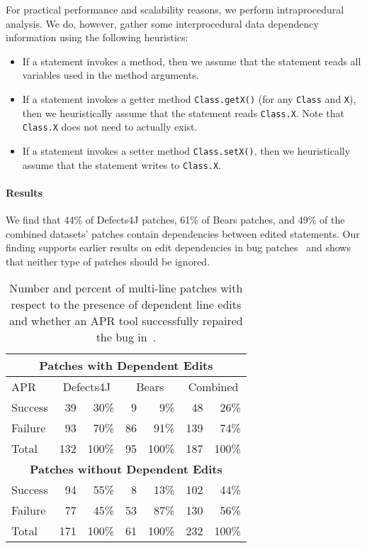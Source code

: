 \documentclass[sigconf, timestamp-false, anonymous=true]{acmart}
\begin{document}
For practical performance and scalability reasons, 
we perform intraprocedural analysis. 
We do, however, gather some interprocedural data dependency information 
using the following heuristics:
\begin{itemize}
	\item If a statement invokes a method, then we assume that
	the statement reads all variables used in the method arguments.
	\item If a statement invokes a getter method \texttt{Class.getX()} 
	(for any \texttt{Class} and \texttt{X}), then we heuristically 
	assume that the statement reads \texttt{Class.X}. 
	Note that \texttt{Class.X} does not need to actually exist.
	\item If a statement invokes a setter method \texttt{Class.setX()}, 
	then we heuristically assume that the statement writes to \texttt{Class.X}. 
\end{itemize}

\paragraph{Results}

We find that 44\% of Defects4J patches, 61\% of Bears patches, 
and 49\% of the combined datasets' patches contain dependencies 
between edited statements.
Our finding supports earlier results on edit dependencies in 
bug patches~\cite{zhong2015} and shows that neither type of 
patches should be ignored.

\begin{table}
{\begin{center}
	\begin{tabular}{l | rr | rr | rr}
		\toprule
		\multicolumn{7}{c}{\textbf{Patches with Dependent Edits}} \\
		\midrule
		APR & \multicolumn{2}{c}{Defects4J} & \multicolumn{2}{c}{Bears} & \multicolumn{2}{c}{Combined} \\
		\midrule
		Success & 39 & 30\% & 9 & 9\% & 48 & 26\% \\
		Failure & 93 & 70\% & 86 & 91\% & 139 & 74\% \\
		\midrule
		Total & 132 & 100\% & 95 & 100\% & 187 & 100\% \\
		\midrule
		\multicolumn{7}{c}{\textbf{Patches without Dependent Edits}} \\
		\midrule
		Success & 94 & 55\% & 8 & 13\% & 102 & 44\% \\
		Failure & 77 & 45\% & 53 & 87\% & 130 & 56\% \\
		\midrule
		Total & 171 & 100\% & 61 & 100\% & 232 & 100\% \\
		\bottomrule
	\end{tabular}
 \end{center}
}
	\caption{Number and percent of multi-line patches with respect to the presence of 
	dependent line edits and whether an APR tool successfully 
	repaired the bug in~\cite{durieux-repair-them-all}.}
	\label{tab:dependency-repair-contingency-table}
\end{table}
\end{document}
